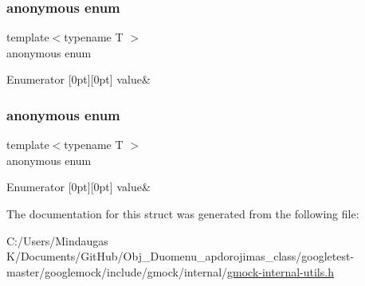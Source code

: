 \subsubsection{\texorpdfstring{anonymous enum}{anonymous enum}}
{\footnotesize\ttfamily template$<$typename T $>$ \\
anonymous enum}

\begin{DoxyEnumFields}{Enumerator}
[0pt][0pt]{}\mbox{\label{structtesting_1_1internal_1_1_kind_of_a2bad32147d808053ad0a98750cf03c68a3926838d30f6dc80ee770b3baa557bc9}} 
value&\\
\hline

\end{DoxyEnumFields}
\mbox{\label{structtesting_1_1internal_1_1_kind_of_a300a5f12967dc8eccdd965d19b648e38}} 
\subsubsection{\texorpdfstring{anonymous enum}{anonymous enum}}
{\footnotesize\ttfamily template$<$typename T $>$ \\
anonymous enum}

\begin{DoxyEnumFields}{Enumerator}
[0pt][0pt]{}\mbox{\label{structtesting_1_1internal_1_1_kind_of_a2bad32147d808053ad0a98750cf03c68a3926838d30f6dc80ee770b3baa557bc9}} 
value&\\
\hline

\end{DoxyEnumFields}


The documentation for this struct was generated from the following file\+:\begin{DoxyCompactItemize}
\item 
C\+:/\+Users/\+Mindaugas K/\+Documents/\+Git\+Hub/\+Obj\+\_\+\+Duomenu\+\_\+apdorojimas\+\_\+class/googletest-\/master/googlemock/include/gmock/internal/\mbox{\hyperlink{googletest-master_2googlemock_2include_2gmock_2internal_2gmock-internal-utils_8h}{gmock-\/internal-\/utils.\+h}}\end{DoxyCompactItemize}
